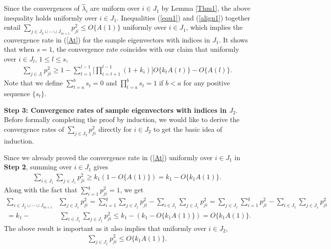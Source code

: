 \documentclass{statsoc}
\begin{document}
Since the convergences of $\widehat{\lambda}_i$ are uniform over $i \in J_1$ by Lemma \ref{Thm1}, the above inequality holds uniformly over $i \in J_1$. Inequalities (\ref{equ1}) and (\ref{align1}) together entail $\sum_{j \in J_2 \cup \cdots \cup J_{m + 1}} p_{ji}^2 \leq O\{A(1)\}$ uniformly over $i \in J_1$, which implies the convergence rate in (\ref{At}) for the sample eigenvectors with indices in $J_1$. It shows that when $s = 1$, the convergence rate coincides with our claim that uniformly over $i \in J_{l}$, $1 \leq l \leq s$,
\begin{align}\label{claim}
\sum_{j \in J_{l}} p_{ji}^2 \geq 1 - \sum_{t = 1}^{l - 1} \big[\prod_{i = t + 1}^{l - 1} (1 + k_i)\big] O\{k_t A(t)\} - O\{A(l)\}.
\end{align}
Note that we define $\sum_{t = a}^{b} s_t = 0$ and $\prod_{t = a}^{b} s_t = 1$ if $b < a$ for any positive sequence $\{s_t\}$.

\medskip

\noindent \textbf{Step 3: Convergence rates of sample eigenvectors with indices in $J_2$}. Before formally completing the proof by induction, we would like to derive the convergence rates of $\sum_{j \in J_2} p_{ji}^2$ directly for $i \in J_2$ to get the basic idea of induction.

Since we already proved the convergence rate in (\ref{At}) uniformly over $i \in J_1$ in \textbf{Step 2}, summing over $i \in J_1$ gives
\begin{align}\label{key1}
\sum_{i \in J_1} \sum_{j \in J_1} p_{ji}^2 \geq k_1(1 - O\{A(1)\}) = k_1 - O\{k_1 A(1)\}.
\end{align}
Along with the fact that $\sum_{i = 1}^q p_{ji}^2 = 1$, we get
\begin{align}\label{key2}
\sum_{i \in J_2 \cup \cdots \cup J_{m + 1}} & \sum_{j \in J_1} p_{ji}^2 = \sum_{i = 1}^q \sum_{j \in J_1} p_{ji}^2 - \sum_{i \in J_1} \sum_{j \in J_1} p_{ji}^2  = \sum_{j \in J_1} \sum_{i = 1}^q p_{ji}^2 - \sum_{i \in J_1} \sum_{j \in J_1} p_{ji}^2 \nonumber \\
= k_1 - & \ \sum_{i \in J_1} \sum_{j \in J_1} p_{ji}^2 \leq k_1 - (k_1 - O\{k_1 A(1)\}) = O\{k_1 A(1)\}.
\end{align}
The above result is important as it also implies that uniformly over $i \in J_2$,
\begin{align}\label{k1A}
\sum_{j \in J_1} p_{ji}^2 \leq O\{k_1 A(1)\}.
\end{align}
\end{document}

